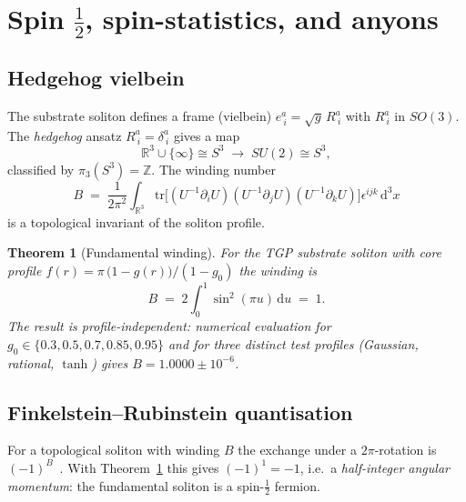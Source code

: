 \documentclass[11pt,a4paper]{article}
\newcommand{\Nwind}{B}
\newcommand{\pithreeS}{\pi_{3}(S^{3})}
\newtheorem{theorem}{Theorem}
\begin{document}
\section{Spin $\tfrac{1}{2}$, spin-statistics, and anyons}\label{sec:spinstat}

\subsection{Hedgehog vielbein}

The substrate soliton defines a frame (vielbein)
$e^{a}_{\ i}=\sqrt{g}\,R^{a}_{\ i}$ with $R^{a}_{\ i}$ in $SO(3)$.
The \emph{hedgehog} ansatz $R^{a}_{\ i}=\delta^{a}_{\ i}$
gives a map
\begin{equation}
  \mathbb{R}^{3}\cup\{\infty\}\cong S^{3} \;\to\; SU(2)\cong S^{3},
\end{equation}
classified by $\pithreeS=\mathbb{Z}$. The winding number
\begin{equation}\label{eq:B-def}
  \Nwind \;=\; \frac{1}{2\pi^{2}}\int_{\mathbb{R}^{3}}
  \mathrm{tr}\bigl[(U^{-1}\partial_{i}U)(U^{-1}\partial_{j}U)(U^{-1}\partial_{k}U)\bigr]
  \epsilon^{ijk}\,\mathrm{d}^{3}x
\end{equation}
is a topological invariant of the soliton profile.

\begin{theorem}[Fundamental winding]\label{thm:B1}
For the TGP substrate soliton with core profile
$f(r)=\pi\,\bigl(1-g(r)\bigr)/(1-g_{0})$ the winding is
\begin{equation}\label{eq:B-integral}
  \Nwind \;=\; 2\int_{0}^{1}\sin^{2}(\pi u)\,\mathrm{d}u \;=\; 1.
\end{equation}
The result is \emph{profile-independent}: numerical evaluation for
$g_{0}\in\{0.3,0.5,0.7,0.85,0.95\}$ and for three distinct test
profiles (Gaussian, rational, $\tanh$) gives $\Nwind=1.0000\pm 10^{-6}$.
\end{theorem}

\subsection{Finkelstein--Rubinstein quantisation}

For a topological soliton with winding $\Nwind$ the exchange under a
$2\pi$-rotation is $(-1)^{\Nwind}$~\cite{FinkelsteinRubinstein}.
With Theorem~\ref{thm:B1} this gives $(-1)^{1}=-1$, i.e.\ a
\emph{half-integer angular momentum}: the fundamental soliton is a
spin-$\tfrac{1}{2}$ fermion.
\end{document}
